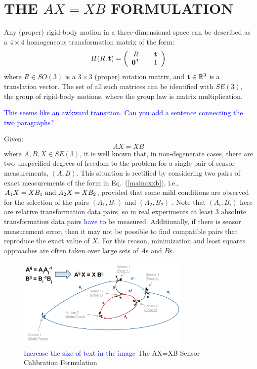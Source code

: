 \documentclass[twocolumn,10pt]{asme2ej}
\newcommand{\ttt}{{\bf t}}
\begin{document}
\section{THE $AX=XB$ FORMULATION}
\label{Formulation}
\noindent Any (proper) rigid-body motion in a three-dimensional space can be described as a $4 \times 4$ homogeneous transformation matrix of the form: 
\begin{equation} 
H(R, \ttt) = \left(
\begin{array}{ccc}
R && {\bf t} \\
{\bf 0}^T && 1 
\end{array} 
\right)
\label{homotrans} 
\end{equation}
where $R \in SO(3)$ is a $3\times 3$ (proper) rotation matrix, and ${\bf t} \in \mathbb{R}^3$ is a translation vector. The set of all such matrices can be identified with $SE(3)$, the group of rigid-body motions, where the group law is matrix multiplication.

\textcolor{blue}{This seems like an awkward transition. Can you add a sentence connecting the two paragraphs?}

Given:
\begin{equation}
A X = X B
\label{mainaxxb}
\end{equation}
where $A,  B, X \in SE(3)$, it is well known that, in non-degenerate cases, there are two unspecified degrees of freedom to the problem for a single pair of sensor measurements, $(A,B)$. This situation is rectified by considering two pairs of exact measurements of the form in Eq.~(\ref{mainaxxb}), i.e., $ {A_1}X=X{B_1} {\rm \,\, and \,\,} {A_2}X = X{B_2} $, provided that some mild conditions are observed for the selection of the pairs $(A_1,B_1)$ and $(A_2,B_2)$ \cite{chen91,park1994robot,shiu1989calibration}. Note that $(A_i, B_i)$ here are relative transformation data pairs, so in real experiments at least 3 absolute transformation data pairs \textcolor{blue}{have to} %
be measured. Additionally, if there is sensor measurement error, then it may not be possible to find compatible pairs that reproduce the exact value of $X$. For this reason, minimization and least squares approaches are often taken over large sets of $A$s and $B$s.

\begin{figure}[t]
\includegraphics[width=3.3in]{figure/AX=XB(ASME)_v1.png}
\centering
\caption{\textcolor{blue}{Increase the size of text in the image} The AX=XB Sensor Calibration Formulation}
\label{AXXBfig1}
\end{figure}
\end{document}
